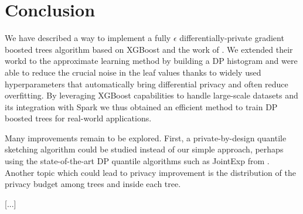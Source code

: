 \documentclass{article}
\theoremstyle{definition}
\begin{document}
\section{Conclusion} 

We have described a way to implement a fully $\epsilon$ differentially-private gradient boosted trees algorithm based on XGBoost and the work of \cite{li2020privacy}. We extended their workd to the approximate learning method by building a DP histogram and were able to reduce the crucial noise in the leaf values thanks to widely used hyperparameters that automatically bring differential privacy and often reduce overfitting. By leveraging XGBoost capabilities to handle large-scale datasets and its integration with Spark we thus obtained an efficient method to train DP boosted trees for real-world applications. 

Many improvements remain to be explored. First, a private-by-design quantile sketching algorithm could be studied instead of our simple approach, perhaps using the state-of-the-art DP quantile algorithms such as JointExp from \cite{gillenwater2021}. Another topic which could lead to privacy improvement is the distribution of the privacy budget among trees and inside each tree. 

[...]
 


\end{document}
